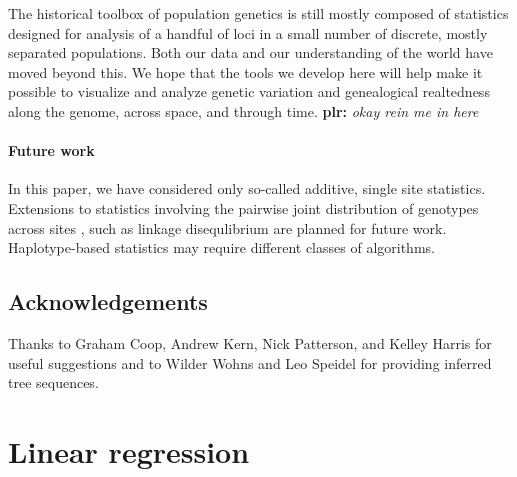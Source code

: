 \documentclass{article}
\newcommand{\plr}[1]{{\color{blue}\textbf{plr:} \it #1}}
\begin{document}
The historical toolbox of population genetics
is still mostly composed of statistics designed for analysis of a handful of loci
in a small number of discrete, mostly separated populations.
Both our data and our understanding of the world have moved beyond this.
We hope that the tools we develop here will help make it possible
to visualize and analyze genetic variation and genealogical realtedness
along the genome, across space, and through time.
\plr{okay rein me in here}


\paragraph{Future work}
In this paper,
we have considered only so-called additive, single site statistics.
Extensions to statistics involving the pairwise joint distribution of genotypes across sites
\citep[as used by][]{hudson2001twolocus},
such as linkage disequlibrium are planned for future work.
Haplotype-based statistics may require different classes of algorithms.




\subsection*{Acknowledgements}
Thanks to Graham Coop, Andrew Kern, Nick Patterson, and Kelley Harris for useful suggestions
and to Wilder Wohns and Leo Speidel for providing inferred tree sequences.




\clearpage
\appendix
\setcounter{table}{0}
\renewcommand{\thetable}{S\arabic{table}}
\setcounter{figure}{0}
\renewcommand{\thefigure}{S\arabic{figure}}




\appendix

\section{Linear regression}
\label{apx:regression}
\end{document}
